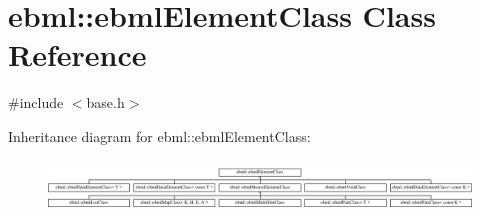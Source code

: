 \hypertarget{classebml_1_1ebmlElementClass}{}\section{ebml\+:\+:ebml\+Element\+Class Class Reference}
\label{classebml_1_1ebmlElementClass}


{\ttfamily \#include $<$base.\+h$>$}

Inheritance diagram for ebml\+:\+:ebml\+Element\+Class\+:\begin{figure}[H]
\begin{center}
\leavevmode
\includegraphics[height=1.365854cm]{classebml_1_1ebmlElementClass}
\end{center}
\end{figure}
